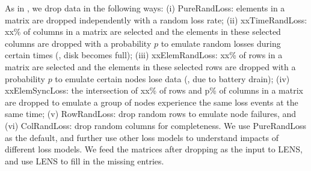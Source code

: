 As in \cite{zhang09sensing}, we drop data in the following ways:
(i) PureRandLoss: elements in a matrix are dropped independently with a
random loss rate; (ii) xxTimeRandLoss: xx\% of columns in a matrix
are selected and the elements in these selected columns are 
dropped with a probability $p$ to emulate random losses during
certain times (\eg, disk becomes full); (iii) xxElemRandLoss: xx\% of
rows in a matrix are selected and the elements in these selected rows
are dropped with a probability $p$ to emulate certain
nodes lose data (\eg, due to battery drain); (iv) xxElemSyncLoss:
the intersection of xx\% of rows and p\% of columns in a matrix are
dropped to emulate a group of nodes experience the same loss events at
the same time; (v) RowRandLoss: drop random rows to emulate node
failures, and (vi) ColRandLoss: drop random columns for completeness. 
We use PureRandLoss as the default, and further use other loss models to
understand impacts of different loss models. We feed the matrices
after dropping as the input to LENS, and use LENS to fill in the
missing entries. 


